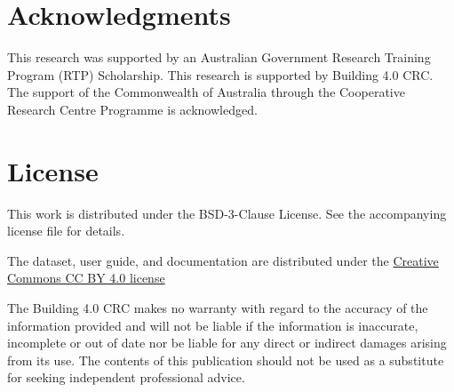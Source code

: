\section*{Acknowledgments}
This research was supported by an Australian Government Research Training Program (RTP) Scholarship. This research is supported by Building 4.0 CRC. The support of the Commonwealth of Australia through the Cooperative Research Centre Programme is acknowledged.


\section*{License}
This work is distributed under the BSD-3-Clause License. See the accompanying license file for details.

The dataset, user guide, and documentation are distributed under the \href{https://creativecommons.org/licenses/by/4.0/}{Creative Commons CC BY 4.0 license}

The Building 4.0 CRC makes no warranty with regard to the accuracy of the information provided and will not be liable if the information is inaccurate, incomplete or out of date nor be liable for any direct or indirect damages arising from its use. The contents of this publication should not be used as a substitute for seeking independent professional advice.


\printbibliography




